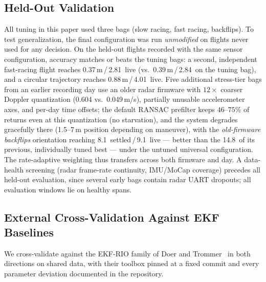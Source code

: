 \documentclass[conference]{IEEEtran}
\begin{document}
\subsection{Held-Out Validation}
\label{sec:heldout}
All tuning in this paper used three bags (slow racing, fast racing,
backflips).  To test generalization, the final configuration was run
\emph{unmodified} on flights never used for any decision.
On the held-out flights recorded with the same sensor configuration,
accuracy matches or beats the tuning bags: a second, independent
fast-racing flight reaches 0.37\,m\,/\,2.81\degree\ live
(vs.\ 0.39\,m\,/\,2.84\degree\ on the tuning bag), and a circular
trajectory reaches 0.88\,m\,/\,4.01\degree\ live.
Five additional stress-tier bags from an earlier recording day use an
older radar firmware with $12\times$ coarser Doppler quantization
(0.604 vs.\ 0.049\,m/s), partially unusable accelerometer axes, and
per-day time offsets; the default RANSAC prefilter keeps
$46$--$75\%$ of returns even at this quantization (no starvation), and
the system degrades gracefully there
(1.5--7\,m position depending on maneuver), with the
\emph{old-firmware backflips} orientation reaching
8.1\degree\ settled\,/\,9.1\degree\ live --- better than the
14.8\degree\ of its previous, individually tuned best --- under the
untuned universal configuration.  The rate-adaptive weighting thus
transfers across both firmware and day.
A data-health screening (radar frame-rate continuity, IMU/MoCap
coverage) precedes all held-out evaluation, since several early bags
contain radar UART dropouts; all evaluation windows lie on healthy
spans.

\subsection{External Cross-Validation Against EKF Baselines}
\label{sec:baselines}
We cross-validate against the EKF-RIO family of Doer and
Trommer~\cite{doer2020ekf,doer2021yrio} in both directions on shared
data, with their toolbox pinned at a fixed commit and every parameter
deviation documented in the repository.
\end{document}
